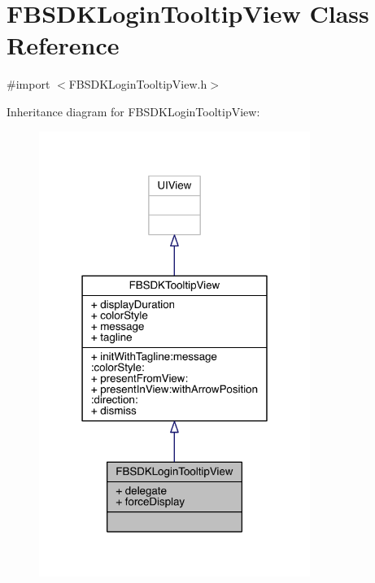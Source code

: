 \hypertarget{interface_f_b_s_d_k_login_tooltip_view}{\section{F\-B\-S\-D\-K\-Login\-Tooltip\-View Class Reference}
\label{interface_f_b_s_d_k_login_tooltip_view}
}


{\ttfamily \#import $<$F\-B\-S\-D\-K\-Login\-Tooltip\-View.\-h$>$}



Inheritance diagram for F\-B\-S\-D\-K\-Login\-Tooltip\-View\-:
\nopagebreak
\begin{figure}[H]
\begin{center}
\leavevmode
\includegraphics[width=250pt]{interface_f_b_s_d_k_login_tooltip_view__inherit__graph}
\end{center}
\end{figure}


